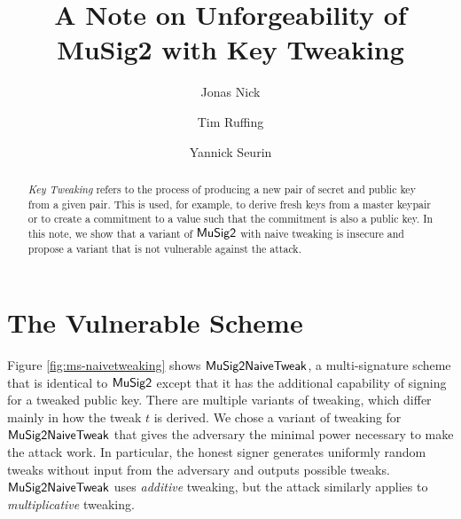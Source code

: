 \documentclass[a4paper,orivec,oribibl,english]{llncs}
\begin{document}
\author{
  Jonas Nick \and
  Tim Ruffing \and
  Yannick Seurin
 }

\title{
    A Note on Unforgeability of MuSig2 with Key Tweaking
}
\maketitle

\begin{abstract}
\emph{Key Tweaking} refers to the process of producing a new pair of secret and public key from a given pair.
This is used, for example, to derive fresh keys from a master keypair or to create a commitment to a value such that the commitment is also a public key.
In this note, we show that a variant of $\mathsf{MuSig2}$ with naive tweaking is insecure and propose a variant that is not vulnerable against the attack.
\end{abstract}

\section{The Vulnerable Scheme}
Figure \ref{fig:ms-naivetweaking} shows $\mathsf{MuSig2NaiveTweak}$, a multi-signature scheme that is identical to $\mathsf{MuSig2}$ except that it has the additional capability of signing for a tweaked public key.
There are multiple variants of tweaking, which differ mainly in how the tweak $t$ is derived.
We chose a variant of tweaking for $\mathsf{MuSig2NaiveTweak}$ that gives the adversary the minimal power necessary to make the attack work.
In particular, the honest signer generates uniformly random tweaks without input from the adversary and outputs possible tweaks.
$\mathsf{MuSig2NaiveTweak}$ uses \emph{additive} tweaking, but the attack similarly applies to \emph{multiplicative} tweaking.
\end{document}
